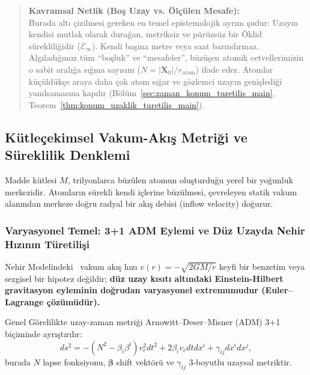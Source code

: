 \begin{quote}
    \small
    \textbf{Kavramsal Netlik (Boş Uzay vs. Ölçülen Mesafe):} \\
    Burada altı çizilmesi gereken en temel epistemolojik ayrım şudur: Uzayın kendisi mutlak olarak durağan, metriksiz ve pürüzsüz bir Öklid sürekliliğidir ($\mathcal{E}_\infty$). Kendi başına metre veya saat barındırmaz. Algıladığımız tüm ``boşluk'' ve ``mesafeler'', büzüşen atomik cetvellerimizin o sabit aralığa sığma sayısını ($N = |\mathbf{X}_0|/r_{\mathrm{atom}}$) ifade eder. Atomlar küçüldükçe araya daha çok atom sığar ve gözlemci uzayın genişlediği yanılsamasına kapılır (Bölüm~\ref{sec:zaman_konum_turetilis_main}, Teorem~\ref{thm:konum_uzaklik_turetilis_main}).
\end{quote}

\subsection{Kütleçekimsel Vakum-Akış Metriği ve Süreklilik Denklemi}
Madde kütlesi $M$, trilyonlarca büzülen atomun oluşturduğu yerel bir yoğunluk merkezidir. Atomların sürekli kendi içlerine büzülmesi, çevreleyen statik vakum alanından merkeze doğru radyal bir akış debisi (inflow velocity) doğurur.

\subsubsection{Varyasyonel Temel: 3+1 ADM Eylemi ve Düz Uzayda Nehir Hızının Türetilişi}
\label{sec:adm_eylem_turetilis}
Nehir Modelindeki~\cite{hamilton2008} vakum akış hızı $v(r) = -\sqrt{2GM/r}$ keyfi bir benzetim veya sezgisel bir hipotez değildir; \textbf{düz uzay kısıtı altındaki Einstein-Hilbert gravitasyon eyleminin doğrudan varyasyonel extremumudur (Euler--Lagrange çözümüdür).}

Genel Görelilikte uzay-zaman metriği Arnowitt--Deser--Misner (ADM) 3+1 biçiminde ayrıştırılır:
\begin{equation}
    ds^2 = -\left(N^2 - \beta_i \beta^i\right) v_c^2 dt^2 + 2 \beta_i v_c dt dx^i + \gamma_{ij} dx^i dx^j,
    \label{eq:adm_metrik_ayrisim}
\end{equation}
burada $N$ lapse fonksiyonu, $\boldsymbol{\beta}$ shift vektörü ve $\gamma_{ij}$ 3-boyutlu uzaysal metriktir.

